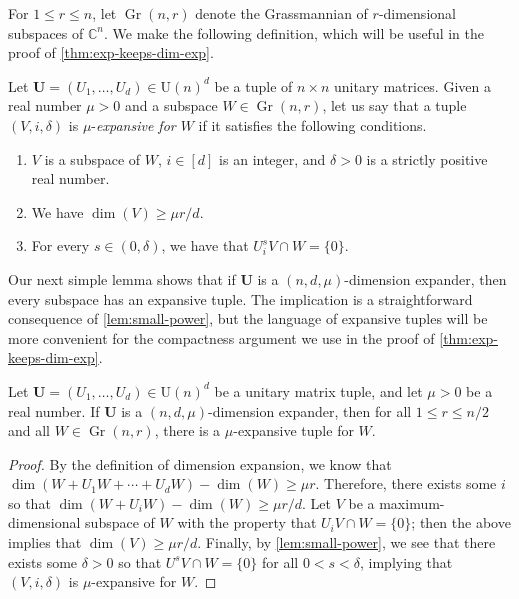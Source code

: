 \documentclass{toc}
\theoremstyle{plain}
\numberwithin{equation}{section}
\theoremstyle{definition}
\DeclareMathOperator\Gr{Gr}
\newcommand{\bC}{\mathbb{C}}
\newcommand{\tuple}[1]{\mathbf{#1}}
\newcommand{\vU}{\tuple{U}}
\begin{document}
For $1 \leq r \leq n$, let $\Gr(n,r)$ denote the Grassmannian of $r$-dimensional subspaces of $\bC^n$. We make the following definition, which will be useful in the proof of \cref{thm:exp-keeps-dim-exp}. 
%
\begin{definition}
    Let $\vU=(U_1,\dots,U_d)\in\mathrm{U}(n)^d$ be a tuple of $n \times n$ unitary matrices. 
    Given a real number $\mu>0$ and a subspace $W \in \Gr(n,r)$, let us say that a tuple $(V,i,\delta)$ is $\mu$-\emph{expansive for $W$} if it satisfies the following conditions.
    \begin{enumerate}[label=(\roman*)]
        \item $V$ is a subspace of $W$, $i \in [d]$ is an integer, and $\delta>0$ is a strictly positive real number.
        \item We have $\dim (V) \geq \mu r/d$.
        \item For every $s \in (0,\delta)$, we have that $U_i^s V \cap W=\{0\}$. 
    \end{enumerate}
\end{definition}
Our next simple lemma shows that if $\vU$ is a $(n,d,\mu)$-dimension expander, then every subspace has an expansive tuple. The implication is a straightforward consequence of \cref{lem:small-power}, but the language of expansive tuples will be more convenient for the compactness argument we use in the proof of \cref{thm:exp-keeps-dim-exp}.
\begin{lemma}\label{lem:expansive-exists}
    Let $\vU=(U_1,\dots,U_d)\in\mathrm{U}(n)^d$ be a unitary matrix tuple, and let $\mu>0$ be a real number. If $\vU$ is a $(n,d,\mu)$-dimension expander, then for all $1 \leq r \leq n/2$ and all $W \in \Gr(n,r)$, there is a $\mu$-expansive tuple for $W$.
\end{lemma}
\begin{proof}
    By the definition of dimension expansion, we know that $\dim(W+U_1 W + \dotsb + U_d W) - \dim(W) \geq \mu r$. Therefore, there exists some $i$ so that $\dim(W+U_i W)-\dim(W) \geq \mu r/d$. Let $V$ be a maximum-dimensional subspace of $W$ with the property that $U_i V \cap W = \{0\}$; then the above implies that $\dim(V) \geq \mu r/d$. Finally, by \cref{lem:small-power}, we see that there exists some $\delta>0$ so that $U^s V \cap W = \{0\}$ for all $0<s<\delta$, implying that $(V,i,\delta)$ is $\mu$-expansive for $W$.
\end{proof}
\end{document}
